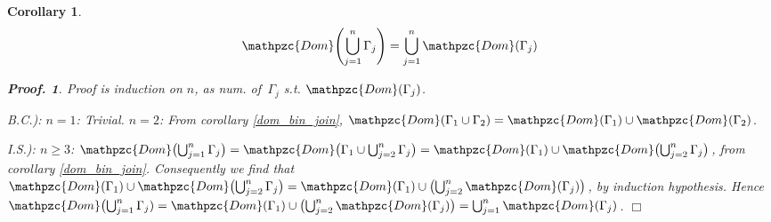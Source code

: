 \documentclass[12pt]{article}
\newtheorem{Corollary}{Corollary}[section]
\newtheorem{Proof}{Proof.}
\begin{document}
\begin{Corollary} \label{dom_mul_join}
  \[ \mathpzc{Dom}\Biggl(\bigcup_{j=1}^{n} \Gamma_j \Biggr) =
      \bigcup_{j=1}^{n} \mathpzc{Dom}(\Gamma_j)
  \]
  \begin{Proof}
    Proof is induction on $n$, as num. of
    $\, \Gamma_j$ s.t. $\mathpzc{Dom}(\Gamma_j)$.
    
    B.C.): $n = 1$: Trivial.
    $n = 2$: From corollary \ref{dom_bin_join},
    $\mathpzc{Dom}(\Gamma_1 \cup \Gamma_2) = \mathpzc{Dom}(\Gamma_1) \cup
    \mathpzc{Dom}(\Gamma_2)$.
    
    I.S.): $n \ge 3$: $\mathpzc{Dom}\bigl(\bigcup_{j=1}^{n} \Gamma_j \bigr)
    = \mathpzc{Dom}\bigl(\Gamma_1 \cup \bigcup_{j=2}^{n} \Gamma_j \bigr) =
    \mathpzc{Dom}(\Gamma_1) \cup \mathpzc{Dom}\bigl(
    \bigcup_{j=2}^{n} \Gamma_j \bigr)$, from corollary \ref{dom_bin_join}.
    Consequently we find that $\mathpzc{Dom}(\Gamma_1) \cup
    \mathpzc{Dom}\bigl(\bigcup_{j=2}^{n} \Gamma_j \bigr) =
    \mathpzc{Dom}(\Gamma_1) \cup \bigl(\bigcup_{j=2}^{n}
    \mathpzc{Dom}(\Gamma_j) \bigr)$, by induction hypothesis. Hence
    $\mathpzc{Dom}\bigl(\bigcup_{j=1}^{n} \Gamma_j) =
    \mathpzc{Dom}(\Gamma_1) \cup
    \bigl(\bigcup_{j=2}^{n} \mathpzc{Dom}(\Gamma_j) \bigr) =
    \bigcup_{j=1}^{n} \mathpzc{Dom}(\Gamma_j)$.
    $\Box$
  \end{Proof}
\end{Corollary}
\end{document}
